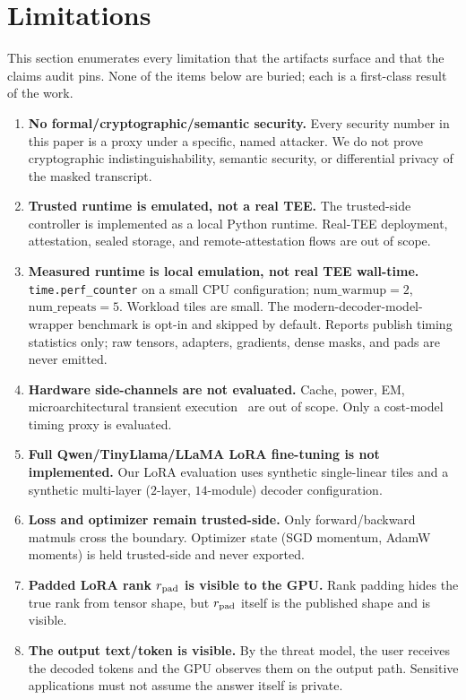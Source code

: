 \section{Limitations}
\label{sec:limitations}

This section enumerates every limitation that the artifacts surface and that the claims audit pins. None of the items below are buried; each is a first-class result of the work.

\begin{enumerate}[leftmargin=*, nosep]
  \item \textbf{No formal/cryptographic/semantic security.} Every security number in this paper is a proxy under a specific, named attacker. We do not prove cryptographic indistinguishability, semantic security, or differential privacy of the masked transcript.
  \item \textbf{Trusted runtime is emulated, not a real TEE.} The trusted-side controller is implemented as a local Python runtime. Real-TEE deployment, attestation, sealed storage, and remote-attestation flows are out of scope.
  \item \textbf{Measured runtime is local emulation, not real TEE wall-time.} \texttt{time.perf\_counter} on a small CPU configuration; $\text{num\_warmup}=2$, $\text{num\_repeats}=5$. Workload tiles are small. The modern-decoder-model-wrapper benchmark is opt-in and skipped by default. Reports publish timing statistics only; raw tensors, adapters, gradients, dense masks, and pads are never emitted.
  \item \textbf{Hardware side-channels are not evaluated.} Cache, power, EM, microarchitectural transient execution~\cite{kocher2019spectre, vanbulck2018foreshadow} are out of scope. Only a cost-model timing proxy is evaluated.
  \item \textbf{Full Qwen/TinyLlama/LLaMA LoRA fine-tuning is not implemented.} Our LoRA evaluation uses synthetic single-linear tiles and a synthetic multi-layer ($2$-layer, $14$-module) decoder configuration.
  \item \textbf{Loss and optimizer remain trusted-side.} Only forward/backward matmuls cross the boundary. Optimizer state (SGD momentum, AdamW moments) is held trusted-side and never exported.
  \item \textbf{Padded LoRA rank $r_{\mathrm{pad}}$ is visible to the GPU.} Rank padding hides the true rank from tensor shape, but $r_{\mathrm{pad}}$ itself is the published shape and is visible.
  \item \textbf{The output text/token is visible.} By the threat model, the user receives the decoded tokens and the GPU observes them on the output path. Sensitive applications must not assume the answer itself is private.

\end{enumerate}

